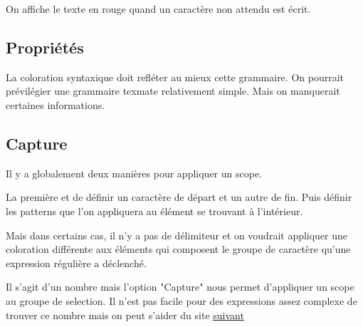\documentclass[
    iict, %
    il, %
]{heig-tb}
\begin{document}

On affiche le texte en rouge quand un caractère non attendu est écrit.

\subsection{Propriétés}

La coloration syntaxique doit refléter au mieux cette grammaire. On pourrait prévilégier une grammaire texmate relativement simple. Mais on manquerait certaines informations.



\subsection{Capture}

Il y a globalement deux manières pour appliquer un scope.

La première et de définir un caractère de départ et un autre de fin. Puis définir les patterns que l'on appliquera au élément se trouvant à l'intérieur.


Mais dans certains cas, il n'y a pas de délimiteur et on voudrait appliquer une coloration différente aux éléments qui composent le groupe de caractère qu'une expression régulière
a déclenché.


Il s'agit d'un nombre mais l'option "Capture" nous permet d'appliquer un scope au groupe de selection.
Il n'est pas facile pour des expressions assez complexe de trouver ce nombre mais on peut s'aider du site \href{https://regex101.com/}{suivant}

\end{document}
